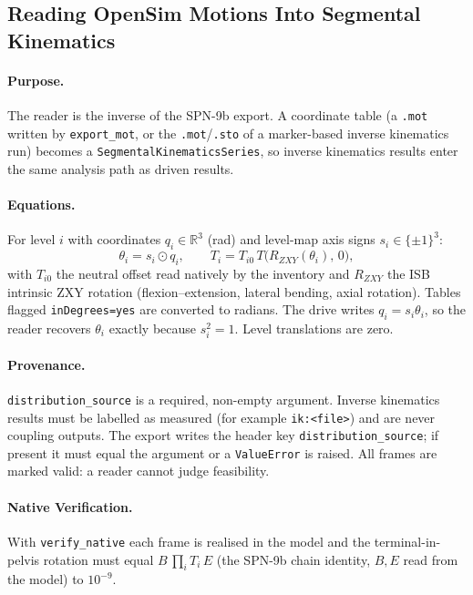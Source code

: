 \subsection{Reading OpenSim Motions Into Segmental Kinematics}
\label{sec:spn-9d}

\paragraph{Purpose.}
The reader is the inverse of the SPN-9b export. A coordinate table (a
\texttt{.mot} written by \texttt{export\_mot}, or the \texttt{.mot}/\texttt{.sto}
of a marker-based inverse kinematics run) becomes a
\texttt{SegmentalKinematicsSeries}, so inverse kinematics results enter the same
analysis path as driven results.

\paragraph{Equations.}
For level $i$ with coordinates $q_i\in\mathbb{R}^3$ (rad) and level-map axis signs
$s_i\in\{\pm1\}^3$:
\begin{equation}
  \theta_i = s_i\odot q_i,\qquad
  T_i = T_{i0}\,T\bigl(R_{ZXY}(\theta_i),\,0\bigr),
\end{equation}
with $T_{i0}$ the neutral offset read natively by the inventory and
$R_{ZXY}$ the ISB intrinsic ZXY rotation (flexion--extension, lateral bending,
axial rotation). Tables flagged \texttt{inDegrees=yes} are converted to radians.
The drive writes $q_i = s_i\theta_i$, so the reader recovers $\theta_i$ exactly
because $s_i^2=1$. Level translations are zero.

\paragraph{Provenance.}
\texttt{distribution\_source} is a required, non-empty argument. Inverse
kinematics results must be labelled as measured (for example
\texttt{ik:<file>}) and are never coupling outputs. The export writes the
header key \texttt{distribution\_source}; if present it must equal the argument
or a \texttt{ValueError} is raised. All frames are marked valid: a reader cannot
judge feasibility.

\paragraph{Native Verification.}
With \texttt{verify\_native} each frame is realised in the model and the
terminal-in-pelvis rotation must equal $B\,\prod_i T_i\,E$ (the SPN-9b chain
identity, $B,E$ read from the model) to $10^{-9}$.

